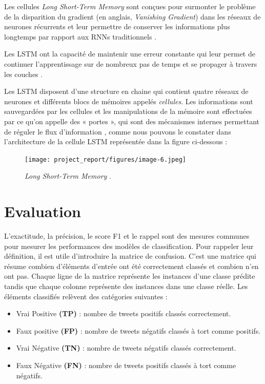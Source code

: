Les cellules \textit{Long Short-Term Memory} sont conçues pour surmonter le problème de la disparition du gradient (en anglais,\textit{ Vanishing Gradient}) dans les réseaux de neurones récurrents et leur permettre de conserver les informations plus longtemps par rapport aux RNNs traditionnels \cite{hochreiter1997}. \par
Les LSTM ont la capacité de maintenir une erreur constante qui leur permet de continuer l’apprentissage sur de nombreux pas de temps et se propager à travers les couches \cite{hochreiter1997}.\par


Les LSTM disposent d’une structure en chaine qui contient quatre réseaux de neurones et différents blocs de mémoires appelés \textit{cellules}. Les informations sont sauvegardées par les cellules et les manipulations de la mémoire sont effectuées par ce qu’on appelle des « portes », qui sont des mécanismes internes permettant de réguler le flux d’information \cite{graves2012}, comme nous pouvons le constater dans l’architecture de la cellule LSTM représentée dans la figure ci-dessous :

\begin{figure}[h]
    \centering
    \texttt{[image: project\_report/figures/image-6.jpeg]} 
    \caption{\textit{Long Short-Term Memory}  \cite{liberiangeek2024}.}
        \label{fig:figureLSTM}
 
\end{figure}



\section{Evaluation}
L'exactitude, la précision, le score F1 et le rappel sont des mesures communes pour mesurer les performances des modèles de classification.
Pour rappeler leur définition, il est utile d'introduire la matrice de confusion. C'est une matrice qui résume combien d'éléments d'entrée ont été correctement classés et combien n'en ont pas. Chaque ligne de la matrice représente les instances d'une classe prédite tandis que chaque colonne représente des instances dans une classe réelle. Les éléments classifiés relèvent des catégories suivantes :

\begin{itemize}
    \item Vrai Positive \textbf{(TP)} : nombre de tweets positifs classés correctement. \par
    \item Faux positive \textbf{(FP) }: nombre de tweets négatifs classés à tort comme positifs.\par
    \item Vrai Négative \textbf{(TN) }: nombre de tweets négatifs classés correctement.\par
    \item Faux Négative \textbf{(FN)} : nombre de tweets positifs classés à tort comme négatifs.\par
\end{itemize}


